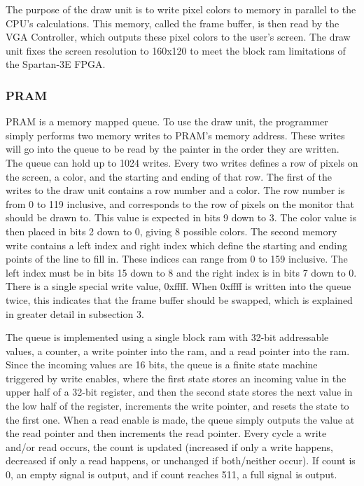 \documentclass[onecolumn]{IEEEtran}
\begin{document}
The purpose of the draw unit is to write pixel colors to memory in parallel to the CPU's calculations.  This memory, called the frame buffer, is then read by the VGA Controller, which outputs these pixel colors to the user's screen.  The draw unit fixes the screen resolution to 160x120 to meet the block ram limitations of the Spartan-3E FPGA.

\subsubsection{PRAM}
PRAM is a memory mapped queue.  To use the draw unit, the programmer simply performs two memory writes to PRAM's memory address.  These writes will go into the queue to be read by the painter in the order they are written.  The queue can hold up to 1024 writes.  Every two writes defines a row of pixels on the screen, a color, and the starting and ending of that row.  The first of the writes to the draw unit contains a row number and a color.  The row number is from 0 to 119 inclusive, and corresponds to the row of pixels on the monitor that should be drawn to.  This value is expected in bits 9 down to 3.  The color value is then placed in bits 2 down to 0, giving 8 possible colors.  The second memory write contains a left index and right index which define the starting and ending points of the line to fill in.  These indices can range from 0 to 159 inclusive.  The left index must be in bits 15 down to 8 and the right index is in bits 7 down to 0.  There is a single special write value, 0xffff.  When 0xffff is written into the queue twice, this indicates that the frame buffer should be swapped, which is explained in greater detail in subsection 3.

The queue is implemented using a single block ram with 32-bit addressable values, a counter, a write pointer into the ram, and a read pointer into the ram.  Since the incoming values are 16 bits, the queue is a finite state machine triggered by write enables, where the first state stores an incoming value in the upper half of a 32-bit register, and then the second state stores the next value in the low half of the register, increments the write pointer, and resets the state to the first one.  When a read enable is made, the queue simply outputs the value at the read pointer and then increments the read pointer.  Every cycle a write and/or read occurs, the count is updated (increased if only a write happens, decreased if only a read happens, or unchanged if both/neither occur).  If count is 0, an empty signal is output, and if count reaches 511, a full signal is output.
\end{document}
